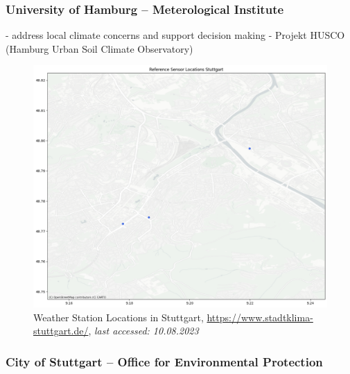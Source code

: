 \subsubsection{University of Hamburg – Meterological Institute}


- address local climate concerns and support decision making
- Projekt HUSCO (Hamburg Urban Soil Climate Observatory)

\begin{figure}[ht]
    \centering
    \includegraphics[width=1\textwidth]{images/afu_stuttgart_sensor_locations.png}
    \caption{Weather Station Locations in Stuttgart, \url{https://www.stadtklima-stuttgart.de/}, \textit{last accessed: 10.08.2023}}
    \label{fig:afu weather station locations}
\end{figure}

\subsubsection{City of Stuttgart – Office for Environmental Protection}

